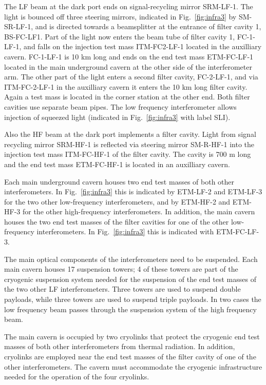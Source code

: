 The LF beam at the dark port ends on signal-recycling mirror SRM-LF-1. The light
is bounced off three steering mirrors, indicated in Fig.~\ref{fig:infra3} by
SM-SR-LF-1, and is directed towards a beamsplitter
at the entrance of filter cavity 1, BS-FC-LF1. Part of the light now enters the beam
tube of filter cavity 1, FC-1-LF-1, and falls on the injection test mass ITM-FC2-LF-1
located in the auxilliary cavern. FC-1-LF-1 is 10 km long and ends on the end test
mass ETM-FC-LF-1 located in the main underground cavern at the other side of the
interferometer arm.
The other part of the light enters a second filter cavity, FC-2-LF-1, and via
ITM-FC-2-LF-1 in the auxilliary cavern it enters the 10 km long filter cavity.
Again a test mass is located in the corner station at the other end. Both filter cavities use
separate beam pipes. The low frequency interferometer allows injection of
squeezed light (indicated in Fig.~\ref{fig:infra3} with label SLI). 

Also the HF beam at the dark port implements a filter cavity. Light from signal
recycling mirror SRM-HF-1 is reflected via steering mirror SM-R-HF-1 into the
injection test mass ITM-FC-HF-1 of the filter cavity. The cavity is 700 m long
and the end test mass ETM-FC-HF-1 is located in an auxilliary cavern.

Each main underground cavern houses two end test masses of both other
interferometers. In Fig.~\ref{fig:infra3} this is indicated by ETM-LF-2 and
ETM-LF-3 for the two other low-frequency interferometers, and by
ETM-HF-2 and ETM-HF-3 for the other high-frequency interferometers.
In addition, the main cavern houses the two end test masses of the filter cavities
for one of the other low-frequency interferometers. In Fig.~\ref{fig:infra3} this is 
indicated with ETM-FC-LF-3.

The main optical components of the interferometers need to be suspended.
Each main cavern houses 17 suspension towers; 4 of these towers are
part of the cryogenic suspension system needed for the suspension of the end
test masses of the two other LF interferometers.
Three towers are used to suspend double payloads, while three towers are used to
suspend triple payloads. In two cases the low frequency beam passes through
the suspension system of the high frequency beam. 

The main cavern is occupied by two cryolinks that protect the cryogenic
end test masses of both other interferometers from thermal radiation. In addition,
cryolinks are employed near the end test masses of the filter cavity of
one of the other interferometers. The cavern must accommodate the cryogenic infrastructure
needed for the operation of the four cryolinks.

